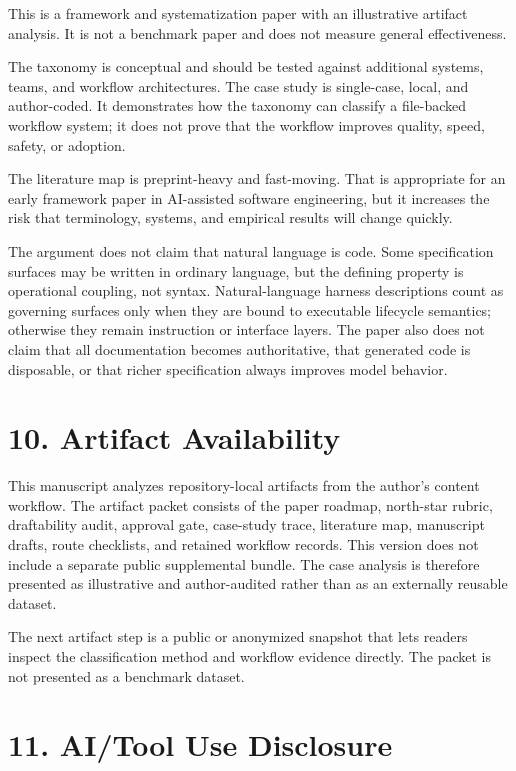\documentclass[
]{article}
\begin{document}
This is a framework and systematization paper with an illustrative
artifact analysis. It is not a benchmark paper and does not measure
general effectiveness.

The taxonomy is conceptual and should be tested against additional
systems, teams, and workflow architectures. The case study is
single-case, local, and author-coded. It demonstrates how the taxonomy
can classify a file-backed workflow system; it does not prove that the
workflow improves quality, speed, safety, or adoption.

The literature map is preprint-heavy and fast-moving. That is
appropriate for an early framework paper in AI-assisted software
engineering, but it increases the risk that terminology, systems, and
empirical results will change quickly.

The argument does not claim that natural language is code. Some
specification surfaces may be written in ordinary language, but the
defining property is operational coupling, not syntax. Natural-language
harness descriptions count as governing surfaces only when they are
bound to executable lifecycle semantics; otherwise they remain
instruction or interface layers. The paper also does not claim that all
documentation becomes authoritative, that generated code is disposable,
or that richer specification always improves model behavior.

\section{10. Artifact Availability}\label{artifact-availability}

This manuscript analyzes repository-local artifacts from the author's
content workflow. The artifact packet consists of the paper roadmap,
north-star rubric, draftability audit, approval gate, case-study trace,
literature map, manuscript drafts, route checklists, and retained
workflow records. This version does not include a separate public
supplemental bundle. The case analysis is therefore presented as
illustrative and author-audited rather than as an externally reusable
dataset.

The next artifact step is a public or anonymized snapshot that lets
readers inspect the classification method and workflow evidence
directly. The packet is not presented as a benchmark dataset.

\section{11. AI/Tool Use Disclosure}\label{aitool-use-disclosure}
\end{document}
